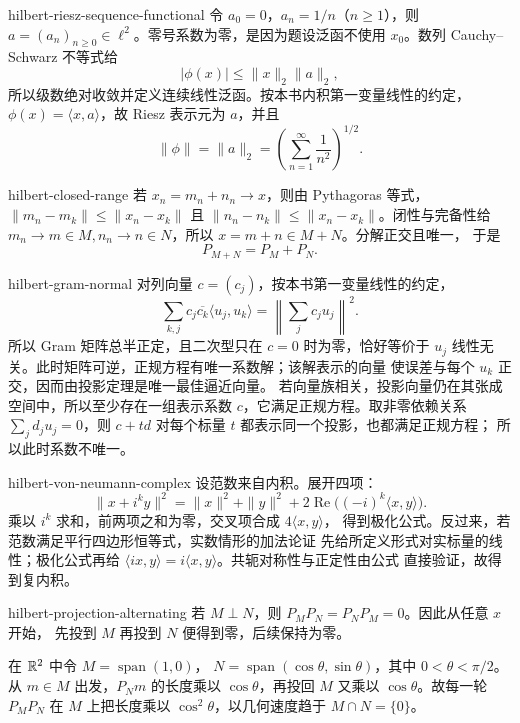 \begin{solution}{hilbert-riesz-sequence-functional}
令 \(a_0=0\)，\(a_n=1/n\)（\(n\ge1\)），则
\(a=(a_n)_{n\ge0}\in\ell^2\)。零号系数为零，是因为题设泛函不使用
\(x_0\)。数列 Cauchy--Schwarz 不等式给
\[
 |\phi(x)|\le\|x\|_2\|a\|_2,
\]
所以级数绝对收敛并定义连续线性泛函。按本书内积第一变量线性的约定，
\(\phi(x)=\langle x,a\rangle\)，故 Riesz 表示元为 \(a\)，并且
\[
 \|\phi\|=\|a\|_2
 =\left(\sum_{n=1}^\infty\frac1{n^2}\right)^{1/2}.
\]
\end{solution}

\begin{solution}{hilbert-closed-range}
若 \(x_n=m_n+n_n\to x\)，则由 Pythagoras 等式，
\(\|m_n-m_k\|\le\|x_n-x_k\|\) 且
\(\|n_n-n_k\|\le\|x_n-x_k\|\)。闭性与完备性给
\(m_n\to m\in M,n_n\to n\in N\)，所以 \(x=m+n\in M+N\)。分解正交且唯一，
于是
\[
 P_{M+N}=P_M+P_N.
\]
\end{solution}

\begin{solution}{hilbert-gram-normal}
对列向量 \(c=(c_j)\)，按本书第一变量线性的约定，
\[
 \sum_{k,j}c_j\overline{c_k}\langle u_j,u_k\rangle
 =\left\|\sum_jc_ju_j\right\|^2.
\]
所以 Gram 矩阵总半正定，且二次型只在 \(c=0\) 时为零，恰好等价于
\(u_j\) 线性无关。此时矩阵可逆，正规方程有唯一系数解；该解表示的向量
使误差与每个 \(u_k\) 正交，因而由投影定理是唯一最佳逼近向量。
若向量族相关，投影向量仍在其张成空间中，所以至少存在一组表示系数
\(c\)，它满足正规方程。取非零依赖关系 \(\sum_jd_ju_j=0\)，则
\(c+td\) 对每个标量 \(t\) 都表示同一个投影，也都满足正规方程；
所以此时系数不唯一。
\end{solution}

\begin{solution}{hilbert-von-neumann-complex}
设范数来自内积。展开四项：
\[
 \|x+i^ky\|^2=\|x\|^2+\|y\|^2
 +2\operatorname{Re}\bigl((-i)^k\langle x,y\rangle\bigr).
\]
乘以 \(i^k\) 求和，前两项之和为零，交叉项合成 \(4\langle x,y\rangle\)，
得到极化公式。反过来，若范数满足平行四边形恒等式，实数情形的加法论证
先给所定义形式对实标量的线性；极化公式再给
\(\langle ix,y\rangle=i\langle x,y\rangle\)。共轭对称性与正定性由公式
直接验证，故得到复内积。
\end{solution}

\begin{solution}{hilbert-projection-alternating}
若 \(M\perp N\)，则 \(P_MP_N=P_NP_M=0\)。因此从任意 \(x\) 开始，
先投到 \(M\) 再投到 \(N\) 便得到零，后续保持为零。

在 \(\mathbb{R}^2\) 中令 \(M=\operatorname{span}(1,0)\)，
\(N=\operatorname{span}(\cos\theta,\sin\theta)\)，其中
\(0<\theta<\pi/2\)。从 \(m\in M\) 出发，\(P_Nm\) 的长度乘以
\(\cos\theta\)，再投回 \(M\) 又乘以 \(\cos\theta\)。故每一轮
\(P_MP_N\) 在 \(M\) 上把长度乘以 \(\cos^2\theta\)，以几何速度趋于
\(M\cap N=\{0\}\)。
\end{solution}
